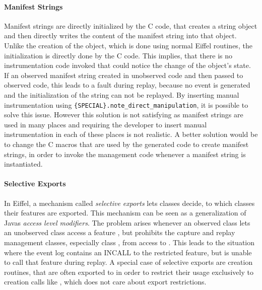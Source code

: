 \paragraph{Manifest Strings}
Manifest strings are directly initialized by the C code, that creates a string object and then directly writes the content of the manifest string into that object. Unlike the creation of the object, which is done using normal Eiffel routines, the initialization is directly done by the C code. This implies, that there is no instrumentation code invoked that could notice the change of the object's state.\\
If an observed manifest string created in unobserved code and then passed to observed code, this leads to a fault during replay, because no event is generated and the initialization of the string can not be replayed. By inserting manual instrumentation using \texttt{\{SPECIAL\}.note\_direct\_manipulation}, it is possible to solve this issue. However this solution is not satisfying as manifest strings are used in many places and requiring the developer to insert manual instrumentation in each of these places is not realistic. A better solution would be to change the C macros that are used by the generated code to create manifest strings, in order to invoke the management code whenever a manifest string is instantiated.

\paragraph{Selective Exports}
In Eiffel, a mechanism called \emph{selective exports} \cite{oosc2} lets classes decide, to which classes their features are exported. This mechanism can be seen as a generalization of Javas \emph{access level modifiers}. The problem arises whenever an observed class lets an unobserved class access a feature , but prohibits the capture and replay management classes, especially class , from access to . This leads to the situation where the event log contains an INCALL to the restricted feature, but  is unable to call that feature during replay. A special case of selective exports are creation routines, that are often exported to  in order to restrict their usage exclusively to creation calls like , which does not care about export restrictions.

